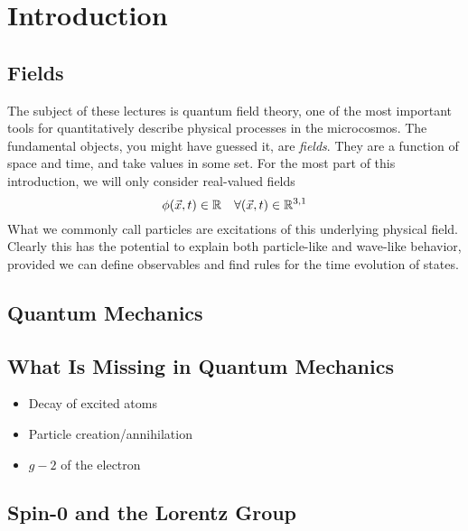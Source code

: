 \documentclass[12pt]{article}
\begin{document}





\section{Introduction}

\subsection{Fields}

The subject of these lectures is quantum field theory, one of the most
important tools for quantitatively describe physical processes in the
microcosmos. The fundamental objects, you might have guessed it, are
\emph{fields}. They are a function of space and time, and take values
in some set. For the most part of this introduction, we will only
consider real-valued fields
\begin{equation}
  \phi(\vec x, t) \in {\mathbb{R}}
  \quad \forall (\vec x, t) \in {\mathbb{R}}^{3,1}  
\end{equation}
What we commonly call particles are excitations of this underlying
physical field. Clearly this has the potential to explain both
particle-like and wave-like behavior, provided we can define
observables and find rules for the time evolution of states.



\subsection{Quantum Mechanics}





\subsection{What Is Missing in Quantum Mechanics}

\begin{itemize}
\item Decay of excited atoms
\item Particle creation/annihilation
\item $g-2$ of the electron
\end{itemize}


\subsection{Spin-0 and the Lorentz Group}
\end{document}
